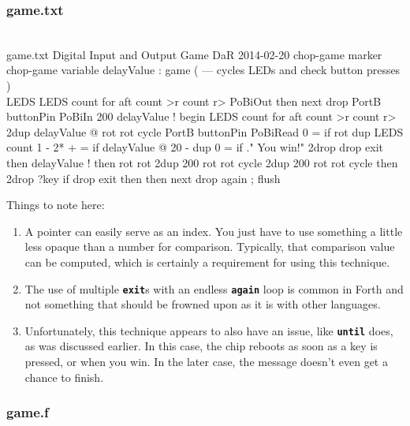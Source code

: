 \documentclass[10pt,english]{article}
\begin{document}
\subsubsection{game.txt}

\nwenddocs{}\endmoddef
\\ game.txt Digital Input and Output Game      DaR 2014-02-20
chop-game
marker chop-game
variable delayValue
: game ( --- cycles LEDs and check button presses )   \\LEDS
   LEDS count for aft  count >r count r> PoBiOut  then next drop
   PortB buttonPin PoBiIn  200 delayValue !
   begin  LEDS count for aft  count >r count r>
         2dup delayValue @ rot rot cycle
         PortB buttonPin PoBiRead 0 = if
            rot dup LEDS count 1 - 2* + = if
               delayValue @ 20 - dup 0 = if
                  ." You win!" 2drop drop exit
               then  delayValue !
            then  rot rot
            2dup 200 rot rot cycle
            2dup 200 rot rot cycle
         then
         2drop  ?key if
            drop exit
         then
   then next  drop  again ;
flush 
\nwendcode{}\nwdocspar

Things to note here:
\begin{enumerate}
\item A pointer can easily serve as an index. You just have to use something
a little less opaque than a number for comparison. Typically, that
comparison value can be computed, which is certainly a requirement
for using this technique.
\item The use of multiple \texttt{\textbf{exit}}s with an endless \texttt{\textbf{again}}
loop is common in Forth and not something that should be frowned upon
as it is with other languages.
\item Unfortunately, this technique appears to also have an issue, like
\texttt{\textbf{until}} does, as was discussed earlier. In this case,
the chip reboots as soon as a key is pressed, or when you win. In
the later case, the message doesn't even get a chance to finish.
\end{enumerate}

\subsubsection{game.f}
\end{document}
